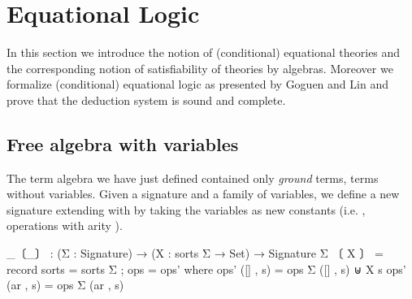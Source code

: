 \section{Equational Logic}
\label{sec:eqlog}

In this section we introduce the notion of (conditional) equational
theories and the corresponding notion of satisfiability of theories
by algebras. Moreover we formalize (conditional) equational logic as
presented by Goguen and Lin \cite{goguen2005specifying} and prove that
the deduction system is sound and complete.

\subsection{Free algebra with variables}
The term algebra we have just defined contained only \emph{ground} terms, \ie
terms without variables. Given a signature  and
\AgdaSpace{}\AgdaSymbol{:}\AgdaSpace{}\AgdaSpace{}
\AgdaSpace{}\AgdaSpace{}
a family of variables, we define a new signature extending  with
 by taking the variables as new constants (i.e. , operations with
arity \AgdaInductiveConstructor{[]}).


\begin{spec}
  _〔_〕 : (Σ : Signature) → (X : sorts Σ → Set) → Signature
  Σ 〔 X 〕 = record  { sorts = sorts Σ ; ops =  ops' }
     where   ops' ([] , s)   = ops Σ ([] , s) ⊎ X s
             ops' (ar , s)   = ops Σ (ar , s)
\end{spec}%

